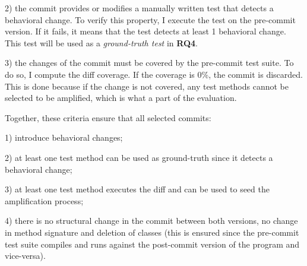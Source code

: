 2) the commit provides or modifies a manually written test that detects a behavioral change. 
To verify this property, I execute the test on the pre-commit version. 
If it fails, it means that the test detects at least 1 behavioral change.
This test will be used as a \textit{ground-truth test} in \textbf{RQ4}.

3) the changes of the commit must be covered by the pre-commit test suite.
To do so, I compute the diff coverage. 
If the coverage is 0\%, the commit is discarded. 
This is done because if the change is not covered, any test methods cannot be selected to be amplified, which is what a part of the evaluation.

Together, these criteria ensure that all selected commits:

1) introduce behavioral changes;

2) at least one test method can be used as ground-truth since it detects a behavioral change;

3) at least one test method executes the diff and can be used to seed the amplification process;

4) there is no structural change in the commit between both versions, \eg no change in method signature and deletion of classes (this is ensured since the pre-commit test suite compiles and runs against the post-commit version of the program and vice-versa).

